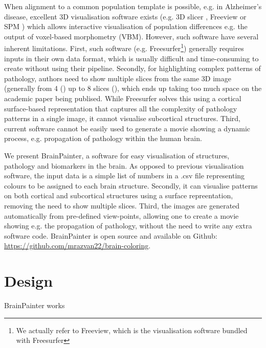 \documentclass[final,5p,times,twocolumn,authoryear]{elsarticle}
\begin{document}
When alignment to a common population template is possible, e.g. in Alzheimer's disease, excellent 3D visualisation software exists (e.g. 3D slicer \cite{pieper20043d}, Freeview \cite{fischl2012freesurfer} or SPM \cite{penny2011statistical}) which allows interactive visualisation of population differences e.g. the output of voxel-based morphometry (VBM). However, such software have several inherent limitations. First, such software (e.g. Freesurfer\footnote{We actually refer to Freeview, which is the visualisation software bundled with Freesurfer}) generally requires inputs in their own data format, which is usually difficult and time-consuming to create without using their pipeline. Secondly, for highlighting complex patterns of pathology, authors need to show multiple slices from the same 3D image (generally from 4 (\cite{seeley2009neurodegenerative}) up to 8 slices (\cite{migliaccio2015mapping}), which ends up taking too much space on the academic paper being publised. While Freesurfer solves this using a cortical surface-based representation that captures all the complexity of pathology patterns in a single image, it cannot visualise subcortical structures. Third, current software cannot be easily used to generate a movie showing a dynamic process, e.g. propagation of pathology within the human brain.

We present BrainPainter, a software for easy visualisation of structures, pathology and biomarkers in the brain. As opposed to previous visualisation software, the input data is a simple list of numbers in a .csv file representing colours to be assigned to each brain structure. Secondly, it can visualise patterns on both cortical and subcortical structures using a surface repreentation, removing the need to show multiple slices. Third, the images are generated automatically from pre-defined view-points, allowing one to create a movie showing e.g. the propagation of pathology, without the need to write any extra software code. BrainPainter is open source and available on Github: \url{https://github.com/mrazvan22/brain-coloring}.



\section{Design}
\label{design}



BrainPainter works 
\end{document}
